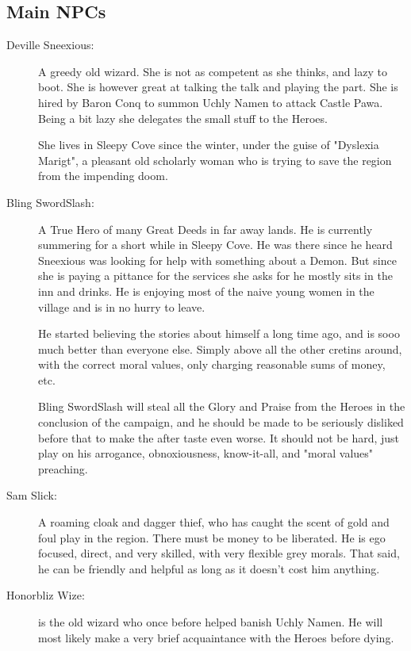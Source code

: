 \subsection*{Main NPCs}

\begin{description}

\item[Deville Sneexious:] A greedy old wizard. She is not as competent as she thinks, and lazy to boot. She is however great at talking the talk and playing the part. She is hired by Baron Conq to summon Uchly Namen to attack Castle Pawa. Being a bit lazy she delegates the small stuff to the Heroes.

She lives in Sleepy Cove since the winter, under the guise of "Dyslexia Marigt", a pleasant old scholarly woman who is trying to save the region from the impending doom.


\item[Bling SwordSlash:] A True Hero of many Great Deeds in far away lands. He is currently summering for a short while in Sleepy Cove. He was there since he heard Sneexious was looking for help with something about a Demon. But since she is paying a pittance for the services she asks for he mostly sits in the inn and drinks. He is enjoying most of the naive young women in the village and is in no hurry to leave.

He started believing the stories about himself a long time ago, and is sooo much better than everyone else. Simply above all the other cretins around, with the correct moral values, only charging reasonable sums of money, etc.

Bling SwordSlash will steal all the Glory and Praise from the Heroes in the conclusion of the campaign, and he should be made to be seriously disliked before that to make the after taste even worse. It should not be hard, just play on his arrogance, obnoxiousness, know-it-all, and "moral values" preaching.


\item[Sam Slick:] A roaming cloak and dagger thief, who has caught the scent of gold and foul play in the region. There must be money to be liberated. He is ego focused, direct, and very skilled, with very flexible grey morals. That said, he can be friendly and helpful as long as it doesn't cost him anything.


\item[Honorbliz Wize:] is the old wizard who once before helped banish Uchly Namen. He will most likely make a very brief acquaintance with the Heroes before dying.



\end{description}

